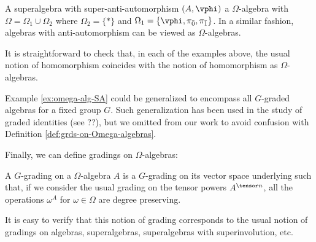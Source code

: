 
\begin{ex}
	A superalgebra with super-anti-automorphism $(A, \vphi)$ a $\Omega$-algebra with $\Omega = \Omega_1 \cup \Omega_2$ where $\Omega_2 = \{ * \}$ and $\Omega_1 = \{ \vphi, \pi_{\bar 0}, \pi_{\bar 1} \}$.
	In a similar fashion, algebras with anti-automorphism can be viewed as $\Omega$-algebras.
\end{ex}

It is straightforward to check that, in each of the examples above, the usual notion of homomorphism coincides with the notion of homomorphism as $\Omega$-algebras.

\begin{remark}
	Example \ref{ex:omega-alg-SA} could be generalized to encompass all $G$-graded algebras for a fixed group $G$.
	Such generalization has been used in the study of graded identities (see ??), but we omitted from our work to avoid confusion with Definition \ref{def:grds-on-Omega-algebras}.
\end{remark}

Finally, we can define gradings on $\Omega$-algebras:

\begin{defi}\label{def:grds-on-Omega-algebras}
	A $G$-grading on a $\Omega$-algebra $A$ is a $G$-grading on its vector space underlying such that, if we consider the usual grading on the tensor powers $A^{\tensor n}$, all the operations $\omega^A$ for $\omega \in \Omega$ are degree preserving.
\end{defi}

It is easy to verify that this notion of grading corresponds to the usual notion of gradings on algebras, superalgebras, superalgebras with superinvolution, etc.


